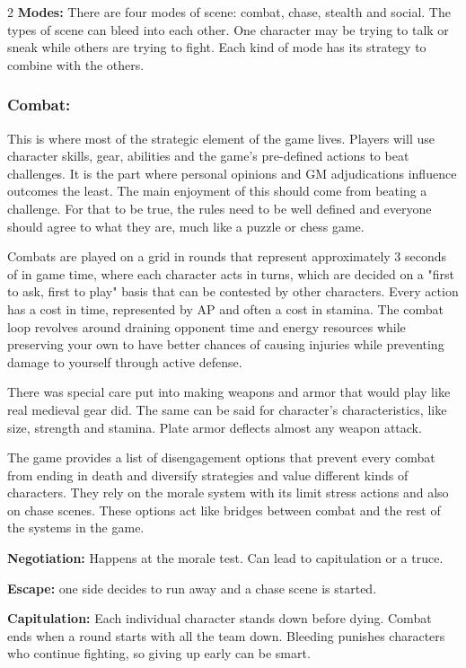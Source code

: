 \begin{multicols}{2}
\textbf{Modes:} There are four modes of scene: combat, chase, stealth and social. The types of scene can bleed into each other. One character may be trying to talk or sneak while others are trying to fight. Each kind of mode has its strategy to combine with the others. 

\subsubsection{Combat:} This is where most of the strategic element of the game lives. Players will use character skills, gear, abilities and the game's pre-defined actions to beat challenges. It is the part where personal opinions and GM adjudications influence outcomes the least. The main enjoyment of this should come from beating a challenge. For that to be true, the rules need to be well defined and everyone should agree to what they are, much like a puzzle or chess game. 

Combats are played on a grid in rounds that represent approximately 3 seconds of in game time, where each character acts in turns, which are decided on a "first to ask, first to play" basis that can be contested by other characters. Every action has a cost in time, represented by AP and often a cost in stamina. The combat loop revolves around draining opponent time and energy resources while preserving your own to have better chances of causing injuries while preventing damage to yourself through active defense.

There was special care put into making weapons and armor that would play like real medieval gear did. The same can be said for character's characteristics, like size, strength and stamina. Plate armor deflects almost any weapon attack. 

The game provides a list of disengagement options that prevent every combat from ending in death and diversify strategies and value different kinds of characters. They rely on the morale system with its limit stress actions and also on chase scenes. These options act like bridges between combat and the rest of the systems in the game.

\begin{proplist}
  \item \textbf{Negotiation:} Happens at the morale test. Can lead to capitulation or a truce.
  \item \textbf{Escape:} one side decides to run away and a chase scene is started.
  \item \textbf{Capitulation:} Each individual character stands down before dying. Combat ends when a round starts with all the team down. Bleeding punishes characters who continue fighting, so giving up early can be smart.
\end{proplist}


\end{multicols}
